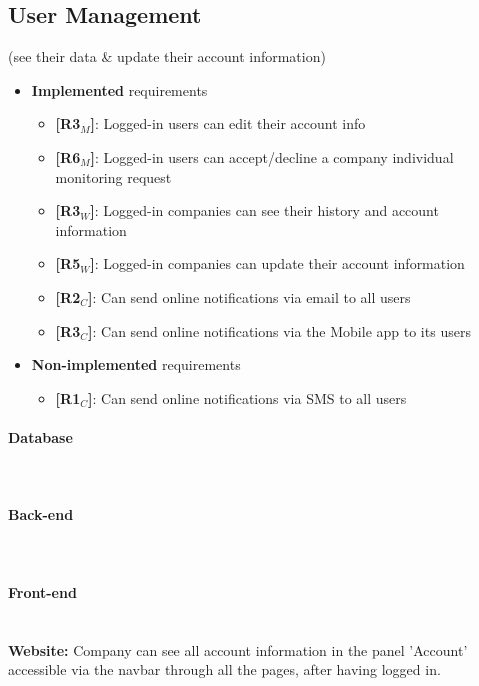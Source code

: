\subsection{User Management}
(see their data & update their account information)


   


\begin{itemize}
    \item \textbf{Implemented} requirements
        \begin{itemize}
      \item \textbf{[R3$_M$]}: Logged-in users can edit their account info
    \item \textbf{[R6$_M$]}: Logged-in users can accept/decline a company individual monitoring request

    \item \textbf{[R3$_W$]}: Logged-in companies can see their history and account information
   \item \textbf{[R5$_W$]}: Logged-in companies can update their account information
   
   
    \item \textbf{[R2$_C$]}: Can send online notifications via email to all users
    \item \textbf{[R3$_C$]}: Can send online notifications via the Mobile app to its users

        \end{itemize}
    \item \textbf{Non-implemented} requirements
    \begin{itemize}
    
    
    \item \textbf{[R1$_C$]}: Can send online notifications via SMS to all users 
        \end{itemize}
\end{itemize}

\paragraph{Database} \mbox{}\\  \paragraph{Back-end} \mbox{}\\  \paragraph{Front-end} \mbox{}\\
\textbf{Website:} Company can see all account information in the panel 'Account' accessible via the navbar through all the pages, after having logged in.\\

